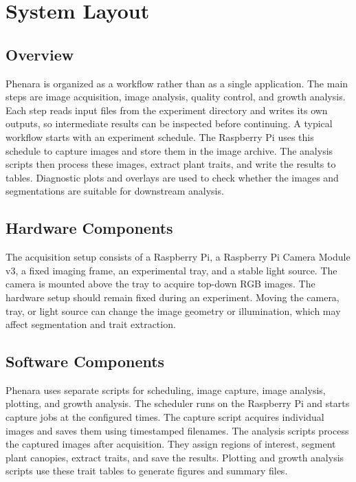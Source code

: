 \section{System Layout}

\subsection{Overview}

Phenara is organized as a workflow rather than as a single application. The
main steps are image acquisition, image analysis, quality control, and growth
analysis. Each step reads input files from the experiment directory and writes
its own outputs, so intermediate results can be inspected before continuing. A
typical workflow starts with an experiment schedule. The Raspberry Pi uses this
schedule to capture images and store them in the image archive. The analysis
scripts then process these images, extract plant traits, and write the results
to tables. Diagnostic plots and overlays are used to check whether the images
and segmentations are suitable for downstream analysis.

\subsection{Hardware Components}

The acquisition setup consists of a Raspberry Pi, a Raspberry Pi Camera Module
v3, a fixed imaging frame, an experimental tray, and a stable light source. The
camera is mounted above the tray to acquire top-down RGB images. The hardware
setup should remain fixed during an experiment. Moving the camera, tray, or
light source can change the image geometry or illumination, which may affect
segmentation and trait extraction.

\subsection{Software Components}

Phenara uses separate scripts for scheduling, image capture, image analysis,
plotting, and growth analysis. The scheduler runs on the Raspberry Pi and
starts capture jobs at the configured times. The capture script acquires
individual images and saves them using timestamped filenames. The analysis
scripts process the captured images after acquisition. They assign regions of
interest, segment plant canopies, extract traits, and save the results.
Plotting and growth analysis scripts use these trait tables to generate figures
and summary files.

